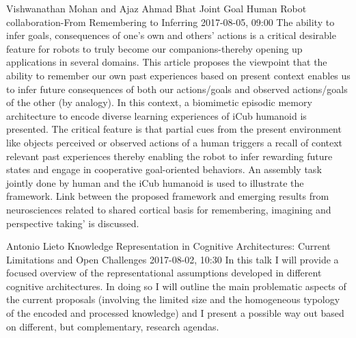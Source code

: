 \documentclass[10pt,fleqn,openany]{book} %
\begin{document}
\begin{enumerate}
		
		\paperabstract
		{Vishwanathan Mohan and Ajaz Ahmad Bhat}
		{Joint Goal Human Robot collaboration-From Remembering to Inferring}
		{2017-08-05, 09:00}
		{The ability to infer goals, consequences of one's own and others' actions is a critical desirable feature for robots to truly become our companions-thereby opening up applications in several domains. This article proposes the viewpoint that the ability to remember our own past experiences based on present context enables us to infer future consequences of both our actions/goals and observed actions/goals of the other (by analogy). In this context, a biomimetic episodic memory architecture to encode diverse learning experiences of iCub humanoid is presented. The critical feature is that partial cues from the present environment like objects perceived or observed actions of a human triggers a recall of context relevant past experiences thereby enabling the robot to infer rewarding future states and engage in cooperative goal-oriented behaviors. An assembly task jointly done by human and the iCub humanoid is used to illustrate the framework.  Link between the proposed framework and emerging results from neurosciences related to shared cortical basis for remembering, imagining and perspective taking' is discussed.}
		
		
		\paperabstract
		{Antonio Lieto}
		{Knowledge Representation in Cognitive Architectures: Current Limitations and Open Challenges}
		{2017-08-02, 10:30}
		{In this talk I will provide a focused overview of the representational assumptions developed in different cognitive architectures. In doing so I will outline the main problematic aspects of the current proposals (involving the limited size and the homogeneous typology of the encoded and processed knowledge) and I present a possible way out based on different, but complementary, research agendas.}
		

\end{enumerate}
\end{document}
